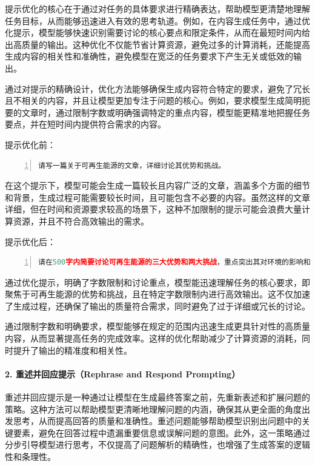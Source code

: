 提示优化的核心在于通过对任务的具体要求进行精确表达，帮助模型更清楚地理解任务目标，从而能够迅速进入有效的思考轨道。例如，在内容生成任务中，通过优化提示，模型能够快速识别需要讨论的核心要点和限定条件，从而在最短时间内给出高质量的输出。这种优化不仅能节省计算资源，避免过多的计算消耗，还能提高生成内容的相关性和准确性，避免模型在宽泛的任务要求下产生无关或低效的输出。

通过对提示的精确设计，优化方法能够确保生成内容符合特定的要求，避免了冗长且不相关的内容，并且让模型更加专注于问题的核心。例如，要求模型生成简明扼要的文章时，通过限制字数或明确强调特定的重点内容，模型能更精准地把握任务要点，并在短时间内提供符合需求的内容。

提示优化前：

\begin{lstlisting}[language={python},label={},caption={}, basicstyle=\footnotesize\ttfamily, breaklines=true, numbers=left, frame=single]
请写一篇关于可再生能源的文章，详细讨论其优势和挑战。
\end{lstlisting}

在这个提示下，模型可能会生成一篇较长且内容广泛的文章，涵盖多个方面的细节和背景，生成过程可能需要较长时间，且可能包含不必要的内容。虽然这样的文章详细，但在时间和资源要求较高的场景下，这种不加限制的提示可能会浪费大量计算资源，并且不符合高效输出的需求。

提示优化后：

\begin{lstlisting}[language={python},label={},caption={}, basicstyle=\footnotesize\ttfamily, breaklines=true, numbers=left, frame=single]
请在500字内简要讨论可再生能源的三大优势和两大挑战，重点突出其对环境的影响和经济效益。
\end{lstlisting}

通过优化提示，明确了字数限制和讨论重点，模型能迅速理解任务的核心要求，即聚焦于可再生能源的优势和挑战，且在特定字数限制内进行高效输出。这不仅加速了生成过程，还确保了输出的质量符合需求，同时避免了过于详细或冗长的讨论。

通过限制字数和明确要求，模型能够在规定的范围内迅速生成更具针对性的高质量内容，从而显著提高任务的完成效率。这样的优化帮助减少了计算资源的消耗，同时提升了输出的精准度和相关性。

\paragraph{2. 重述并回应提示（Rephrase and Respond Prompting）} 

重述并回应提示是一种通过让模型在生成最终答案之前，先重新表述和扩展问题的策略。这种方法可以帮助模型更清晰地理解问题的内涵，确保其从更全面的角度出发思考，从而提高回答的质量和准确性。重述问题能够帮助模型识别出问题中的关键要素，避免在回答过程中遗漏重要信息或误解问题的意图。此外，这一策略通过分步引导模型进行思考，不仅提高了问题解析的精确性，也增强了生成答案的逻辑性和条理性。

